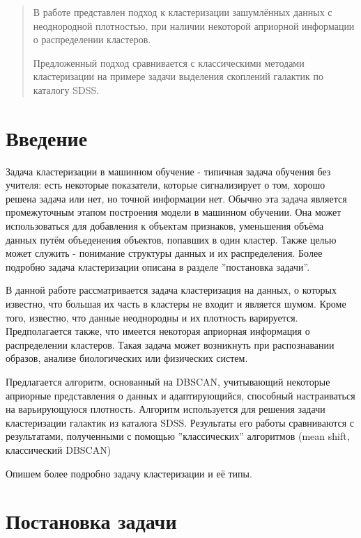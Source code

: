 \documentclass[12pt,fleqn]{article}
\begin{document}
\newpage
\renewcommand{\contentsname}{Содержание}
\tableofcontents

\newpage
\begin{abstract}
    В работе представлен подход к кластеризации зашумлённых данных с неоднородной плотностью, при наличии некоторой априорной информации о распределении кластеров.

   Предложенный подход сравнивается с классическими методами кластеризации на примере задачи выделения скоплений галактик по каталогу SDSS.


\end{abstract}

\newpage
\section{Введение}
Задача кластеризации в машинном обучение - типичная задача обучения без учителя: есть некоторые показатели, которые сигнализирует о том, хорошо решена задача или нет, но точной информации нет. Обычно эта задача является промежуточным этапом построения модели в машинном обучении. Она может использоваться для добавления к объектам признаков, уменьшения объёма данных путём объеденения объектов, попавших в один кластер. Также целью может служить - понимание структуры данных и их распределения. Более подробно задача кластеризации описана в разделе ''постановка задачи''.

В данной работе рассматривается задача кластеризация на данных, о которых известно, что большая их часть в кластеры не входит и является шумом. Кроме того, известно, что данные неоднородны и их плотность варируется. Предполагается также, что имеется некоторая априорная информация о распределении кластеров. Такая задача может возникнуть при распознавании образов, анализе биологических или физических систем.

Предлагается алгоритм, основанный на DBSCAN, учитывающий некоторые априорные представления о данных и адаптирующийся, способный настраиваться на варьирующуюся плотность. Алгоритм используется для решения задачи кластеризации галактик из каталога SDSS. Результаты его работы сравниваются с результатами, полученными с помощью ''классических'' алгоритмов (mean shift, классический DBSCAN)

Опишем более подробно задачу кластеризации и её типы.

\section{Постановка задачи}\label{problem}
\end{document}
